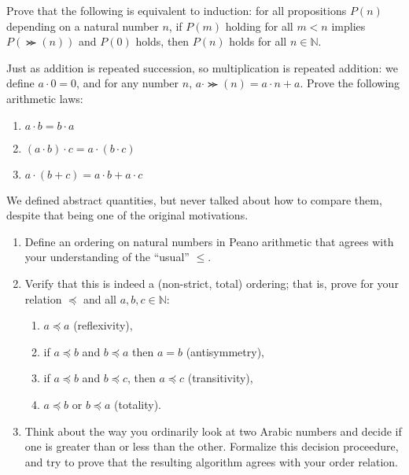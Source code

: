 \begin{prob}
  Prove that the following is equivalent to induction: for all propositions $P(n)$ depending on a natural number $n$,
  if $P(m)$ holding for all $m < n$ implies $P(\Succ(n))$ and $P(0)$ holds, then $P(n)$ holds for all $n \in \mathbb{N}$.
\end{prob}

\begin{prob}
  Just as addition is repeated succession, so multiplication is repeated addition: we define $a \cdot 0 = 0$, and for any number $n$,
  $a \cdot \Succ(n) = a \cdot n + a$.
  Prove the following arithmetic laws:
  \begin{enumerate}
  \item $a \cdot b = b \cdot a$
  \item $(a \cdot b) \cdot c = a \cdot (b \cdot c)$
  \item $a \cdot (b + c) = a \cdot b + a \cdot c$
  \end{enumerate}
\end{prob}

\begin{prob}
  We defined abstract quantities, but never talked about how to compare them, despite that being one of the original motivations.
  \begin{enumerate}
  \item Define an ordering on natural numbers in Peano arithmetic that agrees with your understanding of the ``usual'' $\leq$.
  \item Verify that this is indeed a (non-strict, total) ordering; that is, prove for your relation $\preceq$ and all $a, b, c \in \mathbb{N}$:
    \begin{enumerate}
    \item $a \preceq a$ (reflexivity),
    \item if $a \preceq b$ and $b \preceq a$ then $a = b$ (antisymmetry),
    \item if $a \preceq b$ and $b \preceq c$, then $a \preceq c$ (transitivity),
    \item $a \preceq b$ or $b \preceq a$ (totality).
    \end{enumerate}
  \item Think about the way you ordinarily look at two Arabic numbers and decide if one is greater than or less than the other.
    Formalize this decision proceedure, and try to prove that the resulting algorithm agrees with your order relation.
  \end{enumerate}
\end{prob}

